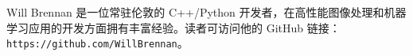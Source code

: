 Will Brennan 是一位常驻伦敦的 C++/Python 开发者，在高性能图像处理和机器学习应用的开发方面拥有丰富经验。读者可访问他的 GitHub 链接：\texttt{https:/\allowbreak{}/\allowbreak{}github.\allowbreak{}com/\allowbreak{}Will\allowbreak{}Brennan}。
